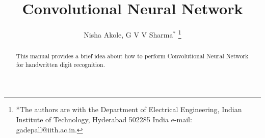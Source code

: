\documentclass[journal,12pt,twocolumn]{IEEEtran}
\begin{document}


\let\StandardTheFigure\thefigure
\let\StandardTheTable\thetable





\def\putbox#1#2#3{\makebox[0in][l]{\makebox[#1][l]{}\raisebox{\baselineskip}[0in][0in]{\raisebox{#2}[0in][0in]{#3}}}}
     \def\rightbox#1{\makebox[0in][r]{#1}}
     \def\centbox#1{\makebox[0in]{#1}}
     \def\topbox#1{\raisebox{-\baselineskip}[0in][0in]{#1}}
     \def\midbox#1{\raisebox{-0.5\baselineskip}[0in][0in]{#1}}



\title{ 
Convolutional Neural Network
}



\author{Nisha Akole, G V V 
Sharma$^{*}$%
\thanks{*The authors are with the Department
of Electrical Engineering, Indian Institute of Technology, Hyderabad
502285 India e-mail:  gadepall@iith.ac.in.}
}


\maketitle

\tableofcontents

\bigskip
%
\begin{abstract}
This manual provides a brief idea about how to perform Convolutional Neural Network for handwritten digit recognition.
\end{abstract}

\IEEEpeerreviewmaketitle
\end{document}
